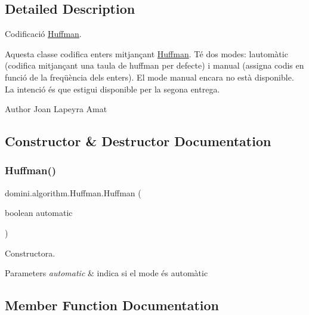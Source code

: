 \subsection{Detailed Description}
Codificació \hyperlink{classdomini_1_1algorithm_1_1Huffman}{Huffman}. 

Aquesta classe codifica enters mitjançant \hyperlink{classdomini_1_1algorithm_1_1Huffman}{Huffman}. Té dos modes\+: l\textquotesingle{}automàtic (codifica mitjançant una taula de huffman per defecte) i manual (assigna codis en funció de la freqüència dels enters). El mode manual encara no està disponible. La intenció és que estigui disponible per la segona entrega.

\begin{DoxyAuthor}{Author}
Joan Lapeyra Amat 
\end{DoxyAuthor}


\subsection{Constructor \& Destructor Documentation}
\mbox{\label{classdomini_1_1algorithm_1_1Huffman_ad5963e423f25e932ed78779bc000edaf}} 
\subsubsection{\texorpdfstring{Huffman()}{Huffman()}}
{\footnotesize\ttfamily domini.\+algorithm.\+Huffman.\+Huffman (\begin{DoxyParamCaption}\item[{boolean}]{automatic }\end{DoxyParamCaption})\hspace{0.3cm}{\ttfamily [inline]}}



Constructora. 


\begin{DoxyParams}{Parameters}
{\em automatic} & indica si el mode és automàtic \\
\hline
\end{DoxyParams}


\subsection{Member Function Documentation}
\mbox{\label{classdomini_1_1algorithm_1_1Huffman_acd2537482f8d719bb37c23ba2d8ec0b1}} 
